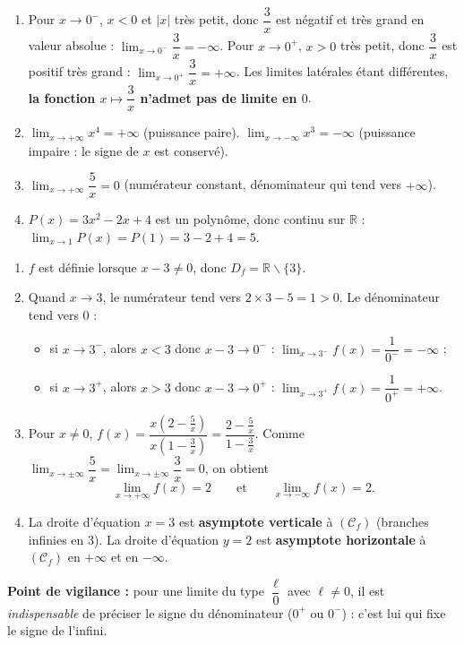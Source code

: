 \documentclass[11pt]{article}
\def\setminus{\mathbin{\backslash}}\let\smallsetminus\setminus
\begin{document}
\begin{corrige}
\begin{enumerate}
\item Pour $x\to 0^-$, $x<0$ et $|x|$ très petit, donc $\dfrac{3}{x}$ est négatif et très grand en valeur absolue : $\displaystyle\lim_{x\to 0^-}\dfrac{3}{x}=-\infty$. Pour $x\to 0^+$, $x>0$ très petit, donc $\dfrac{3}{x}$ est positif très grand : $\displaystyle\lim_{x\to 0^+}\dfrac{3}{x}=+\infty$. Les limites latérales étant différentes, \textbf{la fonction $x\mapsto\dfrac{3}{x}$ n'admet pas de limite en $0$}.
\item $\displaystyle\lim_{x\to+\infty}x^4=+\infty$ (puissance paire). \quad $\displaystyle\lim_{x\to-\infty}x^3=-\infty$ (puissance impaire : le signe de $x$ est conservé).
\item $\displaystyle\lim_{x\to+\infty}\dfrac{5}{x}=0$ (numérateur constant, dénominateur qui tend vers $+\infty$).
\item $P(x)=3x^2-2x+4$ est un polynôme, donc continu sur $\mathbb{R}$ : $\displaystyle\lim_{x\to 1}P(x)=P(1)=3-2+4=5$.
\end{enumerate}
\end{corrige}

\begin{corrige}
\begin{enumerate}
\item $f$ est définie lorsque $x-3\neq 0$, donc $D_f=\mathbb{R}\setminus\{3\}$.
\item Quand $x\to 3$, le numérateur tend vers $2\times 3-5=1>0$. Le dénominateur tend vers $0$ :
\begin{itemize}
\item si $x\to 3^-$, alors $x<3$ donc $x-3\to 0^-$ : $\displaystyle\lim_{x\to 3^-}f(x)=\dfrac{1}{0^-}=-\infty$ ;
\item si $x\to 3^+$, alors $x>3$ donc $x-3\to 0^+$ : $\displaystyle\lim_{x\to 3^+}f(x)=\dfrac{1}{0^+}=+\infty$.
\end{itemize}
\item Pour $x\neq 0$, $f(x)=\dfrac{x\left(2-\frac{5}{x}\right)}{x\left(1-\frac{3}{x}\right)}=\dfrac{2-\frac{5}{x}}{1-\frac{3}{x}}$. Comme $\displaystyle\lim_{x\to\pm\infty}\dfrac{5}{x}=\lim_{x\to\pm\infty}\dfrac{3}{x}=0$, on obtient
\[ \lim_{x\to+\infty}f(x)=2 \qquad\text{et}\qquad \lim_{x\to-\infty}f(x)=2. \]
\item La droite d'équation $x=3$ est \textbf{asymptote verticale} à $(\mathcal{C}_f)$ (branches infinies en $3$). La droite d'équation $y=2$ est \textbf{asymptote horizontale} à $(\mathcal{C}_f)$ en $+\infty$ et en $-\infty$.
\end{enumerate}
\textbf{Point de vigilance :} pour une limite du type $\dfrac{\ell}{0}$ avec $\ell\neq 0$, il est \emph{indispensable} de préciser le signe du dénominateur ($0^+$ ou $0^-$) : c'est lui qui fixe le signe de l'infini.
\end{corrige}
\end{document}
